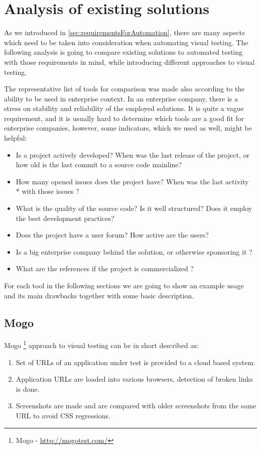 \documentclass[11pt,oneside,final]{fithesis2}
\begin{document}
    
\chapter{Analysis of existing solutions}
\label{chap:analysis}
As we introduced in \ref{sec:requirementsForAutomation}, there are many aspects which need to be taken into consideration when automating visual
testing. The following analysis is going to compare existing solutions to automated testing with those requirements in mind, while introducing
different approaches to visual testing.

The representative list of tools for comparison was made also according to the ability to be used in enterprise context. In an enterprise company, there
is a stress on stability and reliability of the employed solutions. It is quite a vague requirement, and it is usually hard to determine which tools
are a good fit for enterprise companies, however, some indicators, which we used as well, might be helpful:
\begin{itemize}
 \item Is a project actively developed? When was the last release of the project, or how old is the last commit to a source code mainline?
 \item How many opened issues does the project have? When was the last activity \\* with those issues ?
 \item What is the quality of the source code? Is it well structured? Does it employ the best development practices?
 \item Does the project have a user forum? How active are the users?
 \item Is a big enterprise company behind the solution, or otherwise sponsoring it ?
 \item What are the references if the project is commercialized ?
\end{itemize}

For each tool in the following sections we are going to show an example usage and its main drawbacks together with some basic description.
  
  \section{Mogo}
  Mogo \footnote{Mogo - \url{http://mogotest.com/}} approach to visual testing can be in short described as: 
  \begin{enumerate}
   \item Set of URLs of an application under test is provided to a cloud based system.
   \item Application URLs are loaded into various browsers, detection of broken links is done.
   \item Screenshots are made and are compared with older screenshots from the same URL to avoid CSS regressions.
  \end{enumerate}
  
\end{document}
